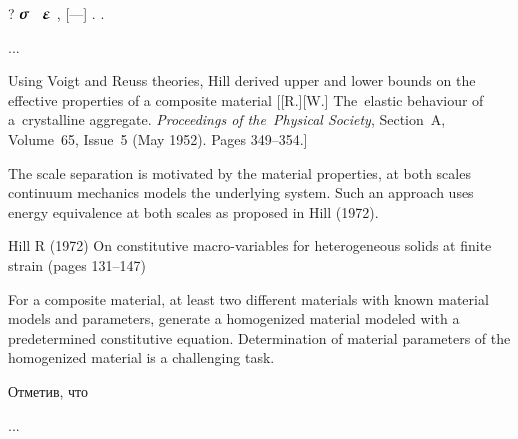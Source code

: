 \label{para:composites.boundaryvalueproblems}

   ?
    ${\hspace{-0.1ex}\linearstress\hspace{.1ex}}$ ~$\infinitesimaldeformation$ ,     [---]    .
\en{,}    .

...



\label{para:composites.hillsfork}

\begin{otherlanguage}{russian}

{\small
\noindent
Using Voigt and Reuss theories, Hill derived upper and lower bounds on the effective properties of a composite material [[R.][W.] The~elastic behaviour of a~crystalline aggregate. \emph{Proceedings of the~Physical Society}, Section~A, Volume~65, Issue~5 (May 1952). Pages 349\hbox{--}354.]

The scale separation is motivated by the material properties, at both scales continuum mechanics models the underlying system.
Such an approach uses energy equivalence at both scales as proposed in Hill (1972).

Hill R (1972) On constitutive macro-variables for heterogeneous solids at finite strain (pages 131–147)

For a composite material, at least two different materials with known material models and parameters, generate a homogenized material modeled with a predetermined constitutive equation. Determination of material parameters of the homogenized material is a challenging task.
\par}

Отметив, что

...



\end{otherlanguage}

